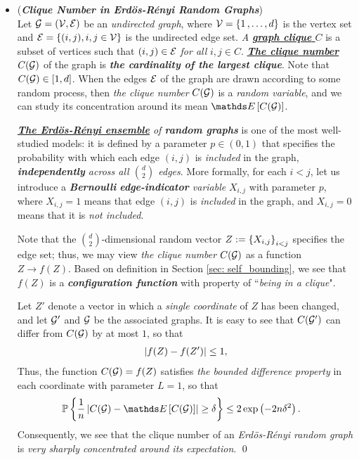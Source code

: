 \documentclass[11pt]{article}
\begin{document}
\begin{itemize}
\item \begin{example} (\textbf{\emph{Clique Number in Erd{\"o}s-R{\'e}nyi Random Graphs}})  \citep{wainwright2019high}\\
Let ${\mathcal G} = ({\mathcal V}, {\mathcal E})$ be an \emph{undirected graph}, where ${\mathcal V} = \left\{1 \,{,}\ldots{,}\, d\right\}$ is the vertex set and ${\mathcal E} = \left\{(i,j), i,j \in {\mathcal V}\right\}$ is the undirected edge set. \emph{A \underline{\textbf{graph clique} $C$}} is a subset of vertices such that $(i, j) \in {\mathcal E}$ \emph{for all} $i, j \in C$. \underline{\emph{\textbf{The clique number}} $C({\mathcal G})$} of the graph is \emph{\textbf{the cardinality of the largest clique}}. Note that $C({\mathcal G}) \in [1, d]$. When the edges ${\mathcal E}$ of the graph are drawn according to some random process, then \emph{the clique number} $C({\mathcal G})$ is a \emph{random variable}, and we can study its concentration around its mean $\E{}{C(\cG)}$.

\emph{\textbf{\underline{The Erd{\"o}s-R{\'e}nyi ensemble}} of \textbf{random graphs}} is one of the most well-studied models: it is defined by a parameter $p \in (0, 1)$ that specifies the probability with which each edge $(i, j)$ is \emph{included} in the graph, \emph{\textbf{independently} across all $d \choose 2$ edges}. More formally, for each $i < j$, let us introduce a \emph{\textbf{Bernoulli} \textbf{edge-indicator} variable} $X_{i,j}$ with parameter $p$, where $X_{i,j} = 1$ means that edge $(i, j)$ is \emph{included} in the graph, and $X_{i,j} = 0$ means that it is \emph{not included}.

Note that the $d \choose 2$-dimensional random vector $Z := \left\{X_{i,j}\right\}_{i< j}$ specifies the edge set; thus, we may view \emph{the clique number} $C({\mathcal G})$ as a function $Z \to f(Z)$. Based on definition in Section \ref{sec: self_bounding}, we see that $f(Z)$ is a \emph{\textbf{configuration function}} with property of ``\emph{being in a clique}".

Let $Z'$ denote a vector in which a \emph{single coordinate} of $Z$ has been changed, and let ${\mathcal G}'$ and ${\mathcal G}$ be the associated graphs. It is easy to see that $C({\mathcal G}')$ can differ from $C({\mathcal G})$ by at most $1$, so that 
\begin{align*}
\left\lvert f(Z) - f(Z') \right\rvert \le 1,
\end{align*}
Thus, the function $C({\mathcal G}) = f(Z)$ satisfies \emph{the bounded difference property} in each coordinate with parameter $L = 1$, so that
\begin{align*}
\bP\set{\frac{1}{n}\abs{C(\cG) - \E{}{C(\cG)}} \ge \delta} &\le 2\exp\paren{- 2 n \delta^2}.
\end{align*}
Consequently, we see that the clique number of an \emph{Erd{\"o}s-R{\'e}nyi random graph} is\emph{ very sharply concentrated around its expectation}. \qed
\end{example}


\end{itemize}
\end{document}
